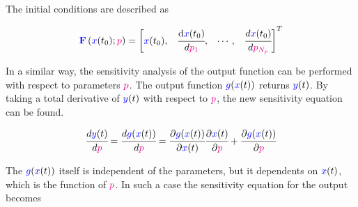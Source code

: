 \documentclass[../Article_Model_Parameters.tex]{subfiles}
\begin{document}
	The initial conditions are described as
	
	{\footnotesize
		\begin{align}
			{\color{blue}\textbf{F}}\left({\color{blue}x}(t_0);{\color{magenta}p}\right)  = 
			\begin{bmatrix} {\color{blue}x}(t_0),			& 
				\cfrac{ \text{d}{\color{blue}x}(t_0) }{ d{\color{magenta}p_1} },		& 
				\cdots,					 	&
				\cfrac{ d{\color{blue}x}(t_0) }{ d{\color{magenta}p_{N_p}} } 
			\end{bmatrix}^T
	\end{align} }
	
	In a similar way, the sensitivity analysis of the output function can be performed with respect to parameters ${\color{magenta}p}$. The output function ${\color{blue}g}({\color{blue}x}(t))$ returns ${\color{blue}y}(t)$. By taking a total derivative of ${\color{blue}y}(t)$ with respect to ${\color{magenta}p}$, the new sensitivity equation can be found.
	
	{\footnotesize
		\begin{align}
			\cfrac{d {\color{blue}y}(t)}{d{\color{magenta}p}} = \cfrac{d {\color{blue}g}({\color{blue}x}(t))}{d{\color{magenta}p}} = \cfrac{\partial {\color{blue}g}({\color{blue}x}(t))}{\partial {\color{blue}x}(t)} \cfrac{\partial {\color{blue}x}(t)}{\partial {\color{magenta}p}} + \cfrac{\partial {\color{blue}g}({\color{blue}x}(t))}{\partial {\color{magenta}p}}
	\end{align} }
	
	The ${\color{blue}g}({\color{blue}x}(t))$ itself is independent of the parameters, but it dependents on ${\color{blue}x}(t)$, which is the function of ${\color{magenta}p}$. In such a case the sensitivity equation for the output becomes
	
\end{document}
